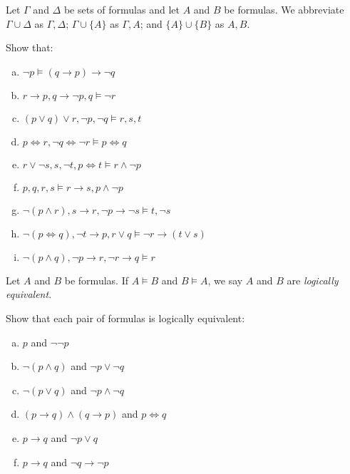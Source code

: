\documentclass{article}
\begin{document}
\begin{notation} 
    Let $\Gamma$ and $\Delta$ be sets of formulas and let $A$ and $B$ be formulas. We abbreviate $\Gamma \cup \Delta$ as $\Gamma, \Delta$; $\Gamma \cup \{ A \}$ as $\Gamma, A$; and $\{ A \} \cup \{ B \}$ as $A, B$.
\end{notation}

\begin{prob}{2.2}
    Show that:
    \begin{multicols}{2}
    \begin{enumerate}[a)]
    \item $\neg p \models (q \to p) \to \neg q$
    \item ${r \to p}, {q \to \neg p}, q \models \neg r$
    \item $(p \vee q) \vee r, \neg p, \neg q \models r, s, t$
    \item ${p \iff r}, {\neg q \iff \neg r} \models {p \iff q}$
    \item ${r \vee \neg s}, s, \neg t, {p \iff t} \models {r \wedge \neg p}$
    \item $p, q, r, s \models {r \to s}, {p \wedge \neg p}$
    \item ${\neg (p \wedge r)}, {s \to r}, {\neg p \to \neg s} \models t, {\neg s}$
    \item ${\neg (p \iff q)}, {\neg t \to p}, {r \vee q} \models {\neg r \to (t \vee s)}$
    \item ${\neg (p \wedge q)}, {\neg p \to r}, {\neg r \to q} \models r$
    \end{enumerate}
    \end{multicols}
\end{prob}

\begin{definition}
    Let $A$ and $B$ be formulas. If $A \models B$ and $B \models A$, we say $A$ and $B$ are \emph{logically equivalent}.
\end{definition}

\begin{prob}{2.3}
    Show that each pair of formulas is logically equivalent:
    \begin{multicols}{2}
    \begin{enumerate}[a)]
    \item $p$ and $\neg \neg p$
    \item $\neg (p \wedge q)$ and $\neg p \vee \neg q$
    \item $\neg (p \vee q)$ and $\neg p \wedge \neg q$
    \item $(p \to q) \wedge (q \to p)$ and $p \iff q$
    \item $p \to q$ and $\neg p \vee q$
    \item $p \to q$ and $\neg q \to \neg p$
    \end{enumerate}
    \end{multicols}
\end{prob}
\end{document}
